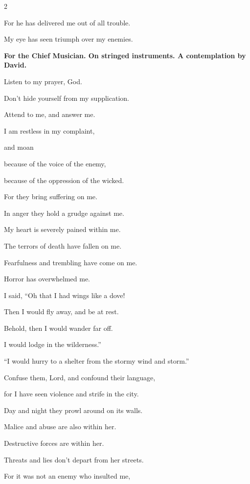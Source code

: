 \begin{multicols}{2}
	
	\myverse{}For he has delivered me out of all trouble.
	
	My eye has seen triumph over my enemies.
	
	
	\mychapter{}\textbf{For the Chief Musician. On stringed instruments. A contemplation by David.}
	
	\myverse*{}Listen to my prayer, God.
	
	Don’t hide yourself from my supplication.
	
	
	\myverse{}Attend to me, and answer me.
	
	I am restless in my complaint,
	
	and moan
	
	\myverse{}because of the voice of the enemy,
	
	because of the oppression of the wicked.
	
	For they bring suffering on me.
	
	In anger they hold a grudge against me.
	
	
	\myverse{}My heart is severely pained within me.
	
	The terrors of death have fallen on me.
	
	
	\myverse{}Fearfulness and trembling have come on me.
	
	Horror has overwhelmed me.
	
	
	\myverse{}I said, “Oh that I had wings like a dove!
	
	Then I would fly away, and be at rest.
	
	
	\myverse{}Behold, then I would wander far off.
	
	I would lodge in the wilderness.”
	
	\vspace{\baselineskip}	
	
	\myverse{}“I would hurry to a shelter from the stormy wind and storm.”
	
	
	\myverse{}Confuse them, Lord, and confound their language,
	
	for I have seen violence and strife in the city.
	
	
	\myverse{}Day and night they prowl around on its walls.
	
	Malice and abuse are also within her.
	
	
	\myverse{}Destructive forces are within her.
	
	Threats and lies don’t depart from her streets.
	
	
	\myverse{}For it was not an enemy who insulted me,
	

\end{multicols}

